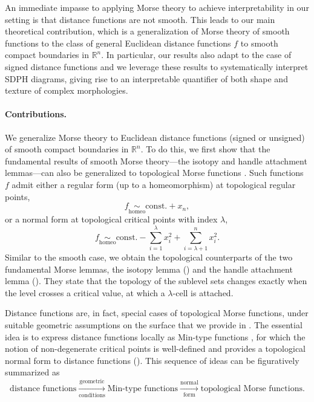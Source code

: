 \documentclass[11pt]{article}
\newcommand{\R}{\mathbb{R}}
\theoremstyle{plain}
\theoremstyle{definition}
\theoremstyle{remark}
\begin{document}
An immediate impasse to applying Morse theory to achieve interpretability in our setting is that distance functions are not smooth.  This leads to our main theoretical contribution, which is a generalization of Morse theory of smooth functions to the class of general Euclidean distance functions $f$ to smooth compact boundaries in $\mathbb{R}^n$.  In particular, our results also adapt to the case of signed distance functions and we leverage these results to systematically interpret SDPH diagrams, giving rise to an interpretable quantifier of both shape and texture of complex morphologies.


\paragraph{Contributions.}
We generalize Morse theory to Euclidean distance functions (signed or unsigned) of smooth compact boundaries in $\R^n$. 
To do this, we first show that the fundamental results of smooth Morse theory---the isotopy and handle attachment lemmas---can also be generalized to topological Morse functions \citep{morse_topologically_1959}. Such functions $f$ admit either a regular form (up to a homeomorphism) at topological regular points,
\[f \underset{\mathrm{homeo}}{\sim} \mathrm{const.} + x_n,\] 
or a normal form at topological critical points with index $\lambda$,
\[ f \underset{\mathrm{homeo}}{\sim} \text{const.} - \sum_{i = 1}^{\lambda} x_i^2 + \sum_{i = \lambda + 1}^{n} x_i^2.\]
Similar to the smooth case, we obtain the topological counterparts of the two fundamental Morse lemmas, the isotopy lemma () and the handle attachment lemma (). They state that the topology of the sublevel sets changes exactly when the level crosses a critical value, at which a $\lambda$-cell is attached.


Distance functions are, in fact, special cases of topological Morse functions, under suitable geometric assumptions on the surface that we provide in . The essential idea is to express distance functions locally as Min-type functions \citep{gershkovich_morse_1997}, for which the notion of non-degenerate critical points is well-defined and provides a topological normal form to distance functions (). This sequence of ideas can be figuratively summarized as
\[\text{distance functions} \xrightarrow[\text{conditions}]{\text{geometric}} \text{Min-type functions} \xrightarrow[\text{form}]{\text{normal}} \text{topological Morse functions}.\]
\end{document}
